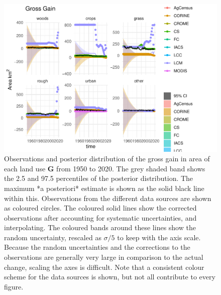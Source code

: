 \documentclass[
]{book}
\begin{document}
\begin{figure}
\includegraphics[width=1.3\linewidth]{Results_ni_files/figure-latex/plotG-1} \caption{ Observations and posterior distribution of the gross gain in area of each land use $\mathbf{G}$ from 1950 to 2020.  The grey shaded band shows the 2.5 and 97.5 percentiles of the posterior distribution. The maximum *a posteriori* estimate is shown as the solid black line within this. Observations from the different data sources are shown as coloured circles. The coloured solid lines show the corrected observations after accounting for systematic uncertainties, and interpolating. The coloured bands around these lines show the random uncertainty, rescaled as $\sigma /5$ to keep with the axis scale. Because the random uncertainties and the corrections to the observations are generally very large in comparison to the actual change, scaling the axes is difficult. Note that a consistent colour scheme for the data sources is shown, but not all contribute to every figure.}\label{fig:plotG}
\end{figure}
\end{document}
